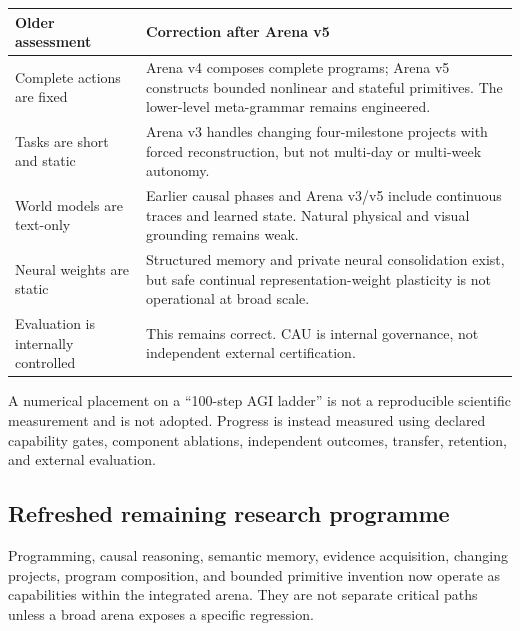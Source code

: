 \begin{center}
\small
\begin{tabular}{|>{\raggedright\arraybackslash}p{3.2cm}|>{\raggedright\arraybackslash}p{8.4cm}|}
\hline
\textbf{Older assessment} & \textbf{Correction after Arena v5} \\
\hline
Complete actions are fixed & Arena v4 composes complete programs; Arena v5 constructs bounded nonlinear and stateful primitives.  The lower-level meta-grammar remains engineered. \\
\hline
Tasks are short and static & Arena v3 handles changing four-milestone projects with forced reconstruction, but not multi-day or multi-week autonomy. \\
\hline
World models are text-only & Earlier causal phases and Arena v3/v5 include continuous traces and learned state.  Natural physical and visual grounding remains weak. \\
\hline
Neural weights are static & Structured memory and private neural consolidation exist, but safe continual representation-weight plasticity is not operational at broad scale. \\
\hline
Evaluation is internally controlled & This remains correct.  CAU is internal governance, not independent external certification. \\
\hline
\end{tabular}
\end{center}

A numerical placement on a ``100-step AGI ladder'' is not a reproducible
scientific measurement and is not adopted.  Progress is instead measured using
declared capability gates, component ablations, independent outcomes, transfer,
retention, and external evaluation.


\subsection{Refreshed remaining research programme}
\label{subsec:post-v5-priorities}

Programming, causal reasoning, semantic memory, evidence acquisition, changing
projects, program composition, and bounded primitive invention now operate as
capabilities within the integrated arena.  They are not separate critical paths
unless a broad arena exposes a specific regression.

